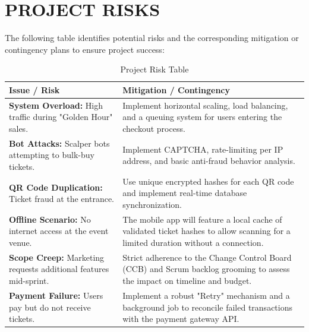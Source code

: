 \chapter{PROJECT RISKS}

The following table identifies potential risks and the corresponding mitigation or contingency plans to ensure project success:

\begin{table}[H]
\centering
\renewcommand{\arraystretch}{1.5}
\begin{tabular}{|p{}|p{}|}
\hline
\rowcolor[HTML]{EFEFEF} 
\textbf{Issue / Risk} & \textbf{Mitigation / Contingency} \\ \hline
\textbf{System Overload:} High traffic during "Golden Hour" sales. & Implement horizontal scaling, load balancing, and a queuing system for users entering the checkout process. \\ \hline
\textbf{Bot Attacks:} Scalper bots attempting to bulk-buy tickets. & Implement CAPTCHA, rate-limiting per IP address, and basic anti-fraud behavior analysis. \\ \hline
\textbf{QR Code Duplication:} Ticket fraud at the entrance. & Use unique encrypted hashes for each QR code and implement real-time database synchronization. \\ \hline
\textbf{Offline Scenario:} No internet access at the event venue. & The mobile app will feature a local cache of validated ticket hashes to allow scanning for a limited duration without a connection. \\ \hline
\textbf{Scope Creep:} Marketing requests additional features mid-sprint. & Strict adherence to the Change Control Board (CCB) and Scrum backlog grooming to assess the impact on timeline and budget. \\ \hline
\textbf{Payment Failure:} Users pay but do not receive tickets. & Implement a robust "Retry" mechanism and a background job to reconcile failed transactions with the payment gateway API. \\ \hline
\end{tabular}
\caption{Project Risk Table}
\end{table}